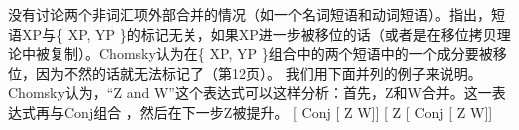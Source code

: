  没有讨论两个非词汇项外部合并的情况（如一个名词短语和动词短语）。\citet[--44]{Chomsky2013a}指出，短语XP与\{ XP, YP \}的标记无关，如果XP进一步被移位的话（或者是在移位拷贝理论中被复制）。Chomsky认为在\{ XP, YP \}组合中的两个短语中的一个成分要被移位，因为不然的话就无法标记了（第12页）。
我们用下面并列的例子来说明。Chomsky认为，“Z  and W”这个表达式可以这样分析：首先，Z和W合并。这一表达式再与Conj组合 ，然后在下一步Z被提升。
\eal
\label{Chomsky-problems-of-projection-coordination}
\ex\label{ex-coord-a} {}[\sub{$\alpha$} Conj [\sub{$\beta$} Z W]]
\ex\label{ex-coord-b} {}[\sub{$\gamma$} Z [\sub{$\alpha$} Conj [\sub{$\beta$} Z W]]
\zl
